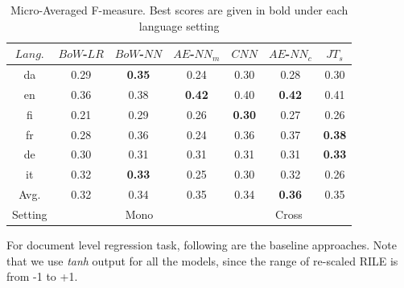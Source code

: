 \documentclass[11pt,a4paper]{article}
\begin{document}
 \begin{table}[!htp]
  \centering
  \begin{tabular}{ c | c c c | c c c}
  \toprule
    $Lang.$ & $BoW$-$LR$ & $BoW$-$NN$ & $AE$-$NN_{m}$ & $CNN$ & $AE$-$NN_{c}$ & $JT_{s}$\\
    \midrule
    da  & 	0.29 & \textbf{0.35} & 0.24 & 0.30 & 0.28 & 0.30\\
    en   &  0.36 & 0.38 & \textbf{0.42} & 0.40 & \textbf{0.42} & 0.41\\    	
    fi  &   0.21 & 0.29 & 0.26 & \textbf{0.30} & 0.27 & 0.26\\
    fr    & 0.28 & 0.36 & 0.24 & 0.36 & 0.37 & \textbf{0.38} \\
    de    &  0.30 & 0.31 & 0.31 & 0.31 & 0.31 & \textbf{0.33}\\
    it    & 0.32 & \textbf{0.33} & 0.25 & 0.30 & 0.32 & 0.26\\
\midrule
Avg.    & 0.32 & 0.34 & 0.35 & 0.34 & \textbf{0.36} & 0.35\\
\midrule
Setting &  \multicolumn{3}{c|}{Mono} & \multicolumn{3}{c}{Cross} \\
 \bottomrule

  \end{tabular}
  \caption{Micro-Averaged F-measure. Best scores are given in bold under each language setting}
  \label{tab:al}
\end{table}

For document level regression task, following are the baseline approaches. Note that we use \textit{tanh} output for all the models, since the range of re-scaled RILE is from -1 to +1.
\end{document}
